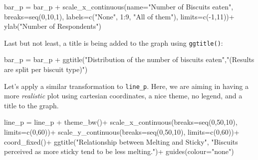 \documentclass[
]{book}
\newenvironment{Shaded}{\begin{snugshade}}{\end{snugshade}}
\newcommand{\AttributeTok}[1]{\textcolor[rgb]{0.77,0.63,0.00}{#1}}
\newcommand{\DecValTok}[1]{\textcolor[rgb]{0.00,0.00,0.81}{#1}}
\newcommand{\FunctionTok}[1]{\textcolor[rgb]{0.00,0.00,0.00}{#1}}
\newcommand{\NormalTok}[1]{#1}
\newcommand{\OtherTok}[1]{\textcolor[rgb]{0.56,0.35,0.01}{#1}}
\newcommand{\SpecialCharTok}[1]{\textcolor[rgb]{0.00,0.00,0.00}{#1}}
\newcommand{\StringTok}[1]{\textcolor[rgb]{0.31,0.60,0.02}{#1}}
\begin{document}
\begin{Shaded}
\begin{Highlighting}[]
\NormalTok{bar\_p }\OtherTok{=}\NormalTok{ bar\_p }\SpecialCharTok{+}
  \FunctionTok{scale\_x\_continuous}\NormalTok{(}\AttributeTok{name=}\StringTok{"Number of Biscuits eaten"}\NormalTok{, }
                     \AttributeTok{breaks=}\FunctionTok{seq}\NormalTok{(}\DecValTok{0}\NormalTok{,}\DecValTok{10}\NormalTok{,}\DecValTok{1}\NormalTok{), }
                     \AttributeTok{labels=}\FunctionTok{c}\NormalTok{(}\StringTok{"None"}\NormalTok{, }\DecValTok{1}\SpecialCharTok{:}\DecValTok{9}\NormalTok{, }\StringTok{"All of them"}\NormalTok{), }
                     \AttributeTok{limits=}\FunctionTok{c}\NormalTok{(}\SpecialCharTok{{-}}\DecValTok{1}\NormalTok{,}\DecValTok{11}\NormalTok{))}\SpecialCharTok{+}
  \FunctionTok{ylab}\NormalTok{(}\StringTok{"Number of Respondents"}\NormalTok{)}
\end{Highlighting}
\end{Shaded}

Last but not least, a title is being added to the graph using \texttt{ggtitle()}:

\begin{Shaded}
\begin{Highlighting}[]
\NormalTok{bar\_p }\OtherTok{=}\NormalTok{ bar\_p }\SpecialCharTok{+}
  \FunctionTok{ggtitle}\NormalTok{(}\StringTok{"Distribution of the number of biscuits eaten"}\NormalTok{,}\StringTok{"(Results are split per biscuit type)"}\NormalTok{)}
\end{Highlighting}
\end{Shaded}

Let's apply a similar transformation to \texttt{line\_p}. Here, we are aiming in having a more \emph{realistic} plot using cartesian coordinates, a nice theme, no legend, and a title to the graph.

\begin{Shaded}
\begin{Highlighting}[]
\NormalTok{line\_p }\OtherTok{=}\NormalTok{ line\_p }\SpecialCharTok{+}
  \FunctionTok{theme\_bw}\NormalTok{()}\SpecialCharTok{+}
  \FunctionTok{scale\_x\_continuous}\NormalTok{(}\AttributeTok{breaks=}\FunctionTok{seq}\NormalTok{(}\DecValTok{0}\NormalTok{,}\DecValTok{50}\NormalTok{,}\DecValTok{10}\NormalTok{), }\AttributeTok{limits=}\FunctionTok{c}\NormalTok{(}\DecValTok{0}\NormalTok{,}\DecValTok{60}\NormalTok{))}\SpecialCharTok{+}
  \FunctionTok{scale\_y\_continuous}\NormalTok{(}\AttributeTok{breaks=}\FunctionTok{seq}\NormalTok{(}\DecValTok{0}\NormalTok{,}\DecValTok{50}\NormalTok{,}\DecValTok{10}\NormalTok{), }\AttributeTok{limits=}\FunctionTok{c}\NormalTok{(}\DecValTok{0}\NormalTok{,}\DecValTok{60}\NormalTok{))}\SpecialCharTok{+}
  \FunctionTok{coord\_fixed}\NormalTok{()}\SpecialCharTok{+}
  \FunctionTok{ggtitle}\NormalTok{(}\StringTok{"Relationship between Melting and Sticky"}\NormalTok{, }\StringTok{"Biscuits perceived as more sticky tend to be less melting."}\NormalTok{)}\SpecialCharTok{+}
  \FunctionTok{guides}\NormalTok{(}\AttributeTok{colour=}\StringTok{"none"}\NormalTok{)}
\end{Highlighting}
\end{Shaded}
\end{document}
